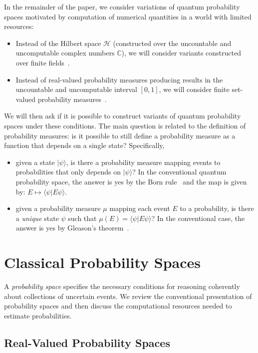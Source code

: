 \documentclass{article}
\theoremstyle{remark}
\newcommand{\Hilb}{\mathcal{H}}
\newcommand{\ket}[1]{|#1\rangle}
\newcommand{\ip}[2]{\langle #1 | #2 \rangle}
\begin{document}
In the remainder of the paper, we consider variations of quantum
probability spaces motivated by computation of numerical quantities in
a world with limited resources:
\begin{itemize}
\item Instead of the Hilbert space $\Hilb$ (constructed over the
  uncountable and uncomputable complex numbers $\mathbb{C}$), we will
  consider variants constructed over finite
  fields~\cite{HansonOrtizSabryEtAl2015,DQT2014,geometry2013}.
\item Instead of real-valued probability measures producing results in
  the uncountable and uncomputable interval $[0,1]$, we will consider
  finite set-valued probability measures~\cite{Artstein1972,PuriRalescu1983}.
\end{itemize}
We will then ask if it is possible to construct variants of quantum
probability spaces under these conditions. The main question is
related to the definition of probability measures: is it possible to
still define a probability measure as a function that depends on a
single state? Specifically,
\begin{itemize}
\item given a state $\ket{\psi}$, is there a probability measure
  mapping events to probabilities that only depends on $\ket{\psi}$?
  In the conventional quantum probability space, the answer is yes by
  the Born rule~\cite{Born1984,Mermin2007} and the map is given by:
  $E \mapsto \ip{\psi}{E\psi}$.
\item given a probability measure $\mu$
  mapping each event $E$
  to a probability, is there a \emph{unique} state $\psi$
  such that $\mu(E)
  =
  \ip{\psi}{E\psi}$? In the conventional case, the answer is yes by
  Gleason's
  theorem~\cite{gleason1957,peres1995quantum,Redhead1987-REDINA}.
\end{itemize}

\section{Classical Probability Spaces}
  
A \emph{probability space} specifies the necessary conditions for
reasoning coherently about collections of uncertain events.  We review
the conventional presentation of probability spaces and then discuss
the computational resources needed to estimate probabilities.

\subsection{Real-Valued Probability Spaces}
\end{document}
